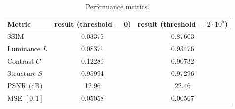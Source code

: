 \begin{table}[H]
    \centering
    \caption{Performance metrics.}
    \begin{tabular}{lcc}
        \toprule
        Metric & result (threshold = 0) & result (threshold = $2\cdot 10^5$) \\
        \midrule
        SSIM & 0.03375 & 0.87603 \\
        Luminance $L$ & 0.08371 & 0.93476 \\
        Contrast $C$ & 0.12280 & 0.90732 \\
        Structure $S$ & 0.95994 & 0.97296 \\
        PSNR (dB) & 12.96 & 22.46 \\
        MSE $[0,1]$ & 0.05058 & 0.00567 \\
        \bottomrule
    \end{tabular}
\end{table}
